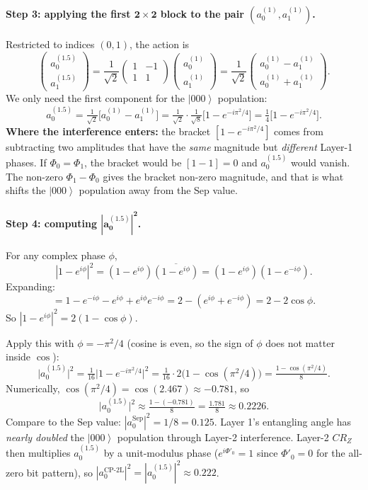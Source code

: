 \documentclass[11pt]{article}
\newcommand{\ket}[1]{\left| #1 \right\rangle}
\begin{document}
\paragraph{Step 3: applying the first $\mathbf{2 \times 2}$ block to the pair $(a^{(1)}_0, a^{(1)}_1)$.} Restricted to indices $(0,1)$, the action is
\[
\begin{pmatrix} a^{(1.5)}_0 \\ a^{(1.5)}_1 \end{pmatrix}
=
\frac{1}{\sqrt{2}}\begin{pmatrix} 1 & -1 \\ 1 & 1 \end{pmatrix}\!
\begin{pmatrix} a^{(1)}_0 \\ a^{(1)}_1 \end{pmatrix}
=
\frac{1}{\sqrt{2}}\begin{pmatrix} a^{(1)}_0 - a^{(1)}_1 \\ a^{(1)}_0 + a^{(1)}_1 \end{pmatrix}.
\]
We only need the first component for the $\ket{000}$ population:
\[
a^{(1.5)}_0 = \tfrac{1}{\sqrt{2}}\bigl[a^{(1)}_0 - a^{(1)}_1\bigr]
= \tfrac{1}{\sqrt{2}} \cdot \tfrac{1}{\sqrt{8}} \bigl[1 - e^{-i\pi^2/4}\bigr]
= \tfrac{1}{4}\bigl[1 - e^{-i\pi^2/4}\bigr].
\]
\textbf{Where the interference enters:} the bracket $[1 - e^{-i\pi^2/4}]$ comes from subtracting two amplitudes that have the \emph{same} magnitude but \emph{different} Layer-1 phases. If $\Phi_0 = \Phi_1$, the bracket would be $[1 - 1] = 0$ and $a^{(1.5)}_0$ would vanish. The non-zero $\Phi_1 - \Phi_0$ gives the bracket non-zero magnitude, and that is what shifts the $\ket{000}$ population away from the Sep value.

\paragraph{Step 4: computing $\mathbf{|a^{(1.5)}_0|^2}$.} For any complex phase $\phi$,
\[
|1 - e^{i\phi}|^2 = (1 - e^{i\phi})\overline{(1 - e^{i\phi})} = (1 - e^{i\phi})(1 - e^{-i\phi}).
\]
Expanding:
\[
= 1 - e^{-i\phi} - e^{i\phi} + e^{i\phi}e^{-i\phi} = 2 - (e^{i\phi} + e^{-i\phi}) = 2 - 2\cos\phi.
\]
So $|1 - e^{i\phi}|^2 = 2(1 - \cos\phi)$.

Apply this with $\phi = -\pi^2/4$ (cosine is even, so the sign of $\phi$ does not matter inside $\cos$):
\[
\bigl|a^{(1.5)}_0\bigr|^2 = \tfrac{1}{16}\bigl|1 - e^{-i\pi^2/4}\bigr|^2 = \tfrac{1}{16} \cdot 2\bigl(1 - \cos(\pi^2/4)\bigr) = \tfrac{1 - \cos(\pi^2/4)}{8}.
\]
Numerically, $\cos(\pi^2/4) = \cos(2.467) \approx -0.781$, so
\[
\bigl|a^{(1.5)}_0\bigr|^2 \approx \tfrac{1 - (-0.781)}{8} = \tfrac{1.781}{8} \approx 0.2226.
\]
Compare to the Sep value: $|a^\text{Sep}_0|^2 = 1/8 = 0.125$. Layer 1's entangling angle has \emph{nearly doubled} the $\ket{000}$ population through Layer-2 interference. Layer-2 $CR_Z$ then multiplies $a^{(1.5)}_0$ by a unit-modulus phase ($e^{i\Phi'_0} = 1$ since $\Phi'_0 = 0$ for the all-zero bit pattern), so $|a^\text{CP-2L}_0|^2 = |a^{(1.5)}_0|^2 \approx 0.222$.
\end{document}
